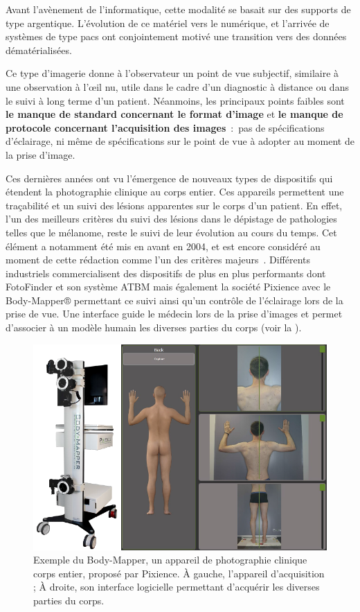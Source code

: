 Avant l’avènement de l’informatique, cette modalité se basait sur des supports de type argentique. L’évolution de ce matériel vers le numérique, et l’arrivée de systèmes de type \gls{pacs} ont conjointement motivé une transition vers des données dématérialisées.\par

Ce type d’imagerie donne à l’observateur un point de vue subjectif, similaire à une observation à l’œil nu, utile dans le cadre d’un diagnostic à distance ou dans le suivi à long terme d’un patient. Néanmoins, les principaux points faibles sont \textbf{le manque de standard concernant le format d'image} et \textbf{le manque de protocole concernant l'acquisition des images}~:~pas de spécifications d'éclairage, ni même de spécifications sur le point de vue à adopter au moment de la prise d'image.\par

Ces dernières années ont vu l'émergence de nouveaux types de dispositifs qui étendent la photographie clinique au corps entier. Ces appareils permettent une traçabilité et un suivi des lésions apparentes sur le corps d'un patient. En effet, l'un des meilleurs critères du suivi des lésions dans le dépistage de pathologies telles que le mélanome, reste le suivi de leur évolution au cours du temps. Cet élément a notamment été mis en avant en 2004, et est encore considéré au moment de cette rédaction comme l'un des critères majeurs~\cite{Abbasi2004,Glazer2017}. Différents industriels commercialisent des dispositifs de plus en plus performants dont FotoFinder et son système ATBM mais également la société Pixience avec le Body-Mapper® permettant ce suivi ainsi qu'un contrôle de l'éclairage lors de la prise de vue. Une interface guide le médecin lors de la prise d'images et permet d'associer à un modèle humain les diverses parties du corps (voir la ).\par

\begin{figure}[H]
\centering
    \includegraphics[width=0.75\linewidth]{contents/chapter_2/resources/example_device_bodymapper.pdf}
    \caption{Exemple du Body-Mapper, un appareil de photographie clinique corps entier, proposé par Pixience. À gauche, l'appareil d'acquisition ; À droite, son interface logicielle permettant d'acquérir les diverses parties du corps.}
    \label{fig:example_device_bodymapper}
\end{figure}\par

